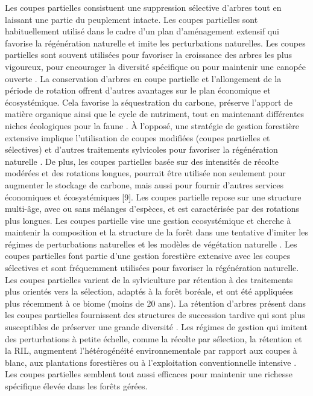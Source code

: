 Les coupes partielles consistuent une suppression sélective d'arbres tout en laissant une partie du peuplement intacte.
Les coupes partielles sont habituellement utilisé dans le cadre d'un plan d'aménagement extensif qui favorise la régénération naturelle et imite les perturbations naturelles.
Les coupes partielles sont souvent utilisées pour favoriser la croissance des arbres les plus vigoureux, pour encourager la diversité spécifique ou pour maintenir une canopée ouverte \citep{Irland2011Timberproductivity,Ameray2021Forestcarbon}.
La conservation d'arbres en coupe partielle et l'allongement de la période de rotation offrent d'autres avantages sur le plan économique et écosystémique. 
Cela favorise la séquestration du carbone, préserve l'apport de matière organique ainsi que le cycle de nutriment, tout en maintenant différentes niches écologiques pour la faune \citep{Barg1999Influencepartial,Tong2020Forestmanagement,Ameray2021Forestcarbon}.
À l'opposé, une stratégie de gestion forestière extensive implique l'utilisation de coupes modifiées (coupes partielles et sélectives) et d'autres traitements sylvicoles pour favoriser la régénération naturelle \citep{Irland2011Timberproductivity}. 
De plus, les coupes partielles basée sur des intensités de récolte modérées et des rotations longues, pourrait être utilisée non seulement pour augmenter le stockage de carbone, mais aussi pour fournir d'autres services économiques et écosystémiques [9].
Les coupes partielle repose sur une structure multi-âge, avec ou sans mélanges d'espèces, et est caractérisée par des rotations plus longues. 
Les coupes partielle vise une gestion ecosystémique et cherche à maintenir la composition et la structure de la forêt dans une tentative d'imiter les régimes de perturbations naturelles et les modèles de végétation naturelle \citep{Bergeron1999Forestmanagementa}.
Les coupes partielles font partie d'une gestion forestière extensive avec les coupes sélectives et sont fréquemment utilisées pour favoriser la régénération naturelle. 
Les coupes partielles varient de la sylviculture par rétention à des traitements plus orientés vers la sélection, adaptés à la forêt boréale, et ont été appliquées plus récemment à ce biome (moins de 20 ans).
La rétention d'arbres présent dans les coupes partielles fournissent des structures de succession tardive qui sont plus susceptibles de préserver une grande diversité \citep{Ameray2021Forestcarbon}.
Les régimes de gestion qui imitent des perturbations à petite échelle, comme la récolte par sélection, la rétention et la RIL, augmentent l'hétérogénéité environnementale par rapport aux coupes à blanc, aux plantations forestières ou à l'exploitation conventionnelle intensive \citep{Oheimb2009Selectionharvest,Gustafsson2010Treeretention}. 
Les coupes partielles semblent tout aussi efficaces pour maintenir une richesse spécifique élevée dans les forêts gérées. 


